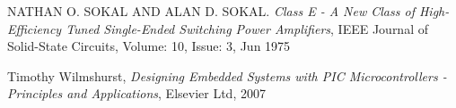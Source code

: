 \begin{thebibliography}{99}
	NATHAN O. SOKAL AND ALAN D. SOKAL. \emph{Class E - A New Class of High-Efficiency Tuned Single-Ended Switching Power Amplifiers},  IEEE Journal of Solid-State Circuits, Volume: 10, Issue: 3, Jun 1975 

	Timothy Wilmshurst, \emph{Designing Embedded Systems with PIC Microcontrollers - Principles and Applications},  Elsevier Ltd, 2007 




\begin{comment}
\bibitem{overprotection}
	Overvoltage and Reverce-voltage Protection in Automotive Systems,
	Application note 760, \emph{Maxim integrated}, Apr 02, 2002, 
	\url{https://www.maximintegrated.com/en/app-notes/index.mvp/id/760}.
\end{comment}




\end{thebibliography}
